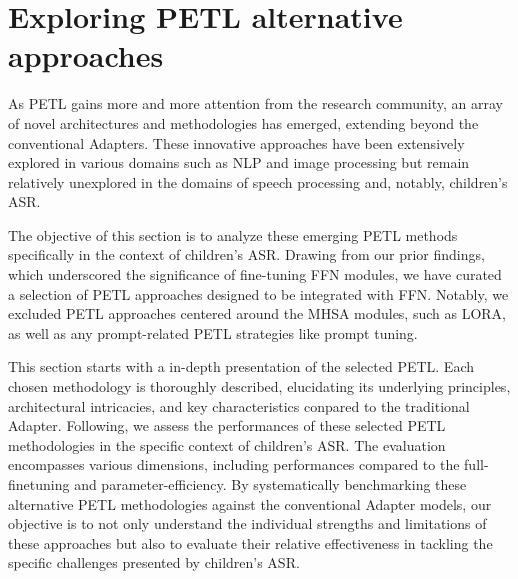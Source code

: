 \section{Exploring PETL alternative approaches}
As PETL gains more and more attention from the research community, an array of novel architectures and methodologies has emerged, extending beyond the conventional Adapters. These innovative approaches have been extensively explored in various domains such as NLP and image processing but remain relatively unexplored in the domains of speech processing and, notably, children's ASR.

The objective of this section is to analyze these emerging PETL methods specifically in the context of children's ASR. Drawing from our prior findings, which underscored the significance of fine-tuning FFN modules, we have curated a selection of PETL approaches designed to be integrated with FFN. Notably, we excluded PETL approaches centered around the MHSA modules, such as LORA, as well as any prompt-related PETL strategies like prompt tuning.

This section starts with a in-depth presentation of the selected PETL. Each chosen methodology is thoroughly described, elucidating its underlying principles, architectural intricacies, and key characteristics conpared to the traditional Adapter. 
Following, we assess the performances of these selected PETL methodologies  in the specific context of children's ASR. The evaluation encompasses various dimensions, including performances compared to the full-finetuning and parameter-efficiency. By systematically benchmarking these alternative PETL methodologies against the conventional Adapter models, our objective is to not only understand the individual strengths and limitations of these approaches but also to evaluate their relative effectiveness in tackling the specific challenges presented by children's ASR.


